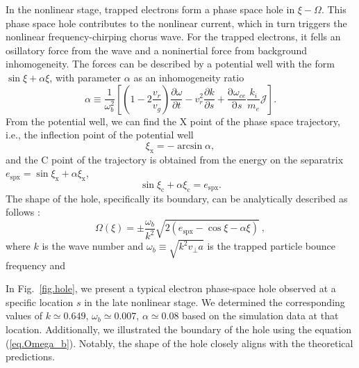 In the nonlinear stage, trapped electrons form a phase space hole in $\xi-\Omega$. This phase space hole contributes to the nonlinear current, which in turn triggers the nonlinear frequency-chirping chorus wave. 
For the trapped electrons, it fells an osillatory force from the wave and a noninertial force from background inhomogeneity. The forces can be described by a potential well with the form $\sin \xi + \alpha \xi$, with parameter $\alpha$ as an inhomogeneity ratio \cite{omura2008,tao2020}
\begin{equation}\label{eq.alp}
    \alpha \equiv \frac{1}{\omega_{b}^2}\left[\left(1 - 2\frac{v_r}{v_g}\right)\frac{\partial \omega}{\partial t}  -v_r^2 \frac{\partial k}{\partial s}+ \frac{\mathrm{\partial} \omega_{ce}}{\mathrm{\partial} s}\frac{k_i}{m_e}\mathcal{J}\right].
\end{equation}
From the potential well, we can find the X point of the phase space trajectory, i.e., the inflection point of the potential well
\begin{equation}
    \xi_\mathrm{x} = - \arcsin \alpha,
\end{equation}
and the C point of the trajectory is obtained from the energy on the separatrix $e_\mathrm{spx} = \sin \xi_\mathrm{x} + \alpha \xi_\mathrm{x}$,
\begin{equation}
    \sin \xi_\mathrm{c} + \alpha \xi_\mathrm{c} = e_\mathrm{spx}.
\end{equation}
The shape of the hole, specifically its boundary, can be analytically described as follows \cite{omura2008}:
\begin{equation}\label{eq.Omega_b}
    \Omega(\xi) = \pm \frac{\omega_b}{k^2} \sqrt{2 (e_\mathrm{spx}-\cos \xi - \alpha \xi)}~,
\end{equation}
where $k$ is the wave number and $\omega_b\equiv \sqrt{k^2 v_\perp a}$ is the trapped particle bounce frequency and


In Fig.~\ref{fig.hole}, we present a typical electron phase-space hole observed at a specific location $s$ in the late nonlinear stage. We determined the corresponding values of $k \simeq 0.649$, $\omega_b \simeq 0.007$, $\alpha \simeq 0.08$ based on the simulation data at that location. Additionally, we illustrated the boundary of the hole using the equation (\ref{eq.Omega_b}). Notably, the shape of the hole closely aligns with the theoretical predictions.

